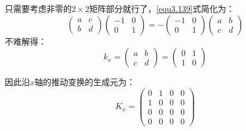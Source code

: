 只需要考虑非零的$2 \times 2$矩阵部分就行了，\eqref{equ3.139}式简化为：
\[
	\begin{pmatrix}
		a & c \\
		b & d
	\end{pmatrix}
	\begin{pmatrix}
		-1 & 0 \\
		0 & 1
	\end{pmatrix}
	= -
	\begin{pmatrix}
		-1 & 0 \\
		0 & 1
	\end{pmatrix}
	\begin{pmatrix}
		a & b \\
		c & d
	\end{pmatrix}
\]
不难解得：
\[
	k_x =
		\begin{pmatrix}
			a & b \\
			c & d
		\end{pmatrix}
	=
		\begin{pmatrix}
			0 & 1 \\
			1 & 0
		\end{pmatrix}
\]

因此沿$x$轴的推动变换的生成元为：
\begin{equation}
\label{equ3.141}
	K_x =
		\begin{pmatrix}
			0 & 1 & 0 & 0 \\
			1 & 0 & 0 & 0 \\
			0 & 0 & 0 & 0 \\
			0 & 0 & 0 & 0
		\end{pmatrix}
\end{equation}


